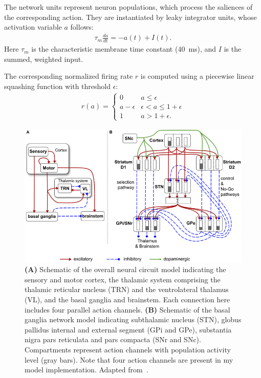 \documentclass[a4paper]{scrreprt}
\begin{document}
The network units represent neuron populations, which process the saliences of the corresponding action. They are instantiated by leaky integrator units, whose activation variable $a$ follows:
\begin{align}
\tau_m\frac{da}{dt} = -a(t)+I(t).
\end{align}
Here $\tau_m$ is the characteristic membrane time constant (40~ms), and $I$ is the summed, weighted input.

The corresponding normalized firing rate $r$ is computed using a piecewise linear squashing function with threshold $\epsilon$:
\begin{align}
r(a) = 
\begin{cases}
0 & a \le \epsilon\\
a-\epsilon & \epsilon < a \le 1+\epsilon\\
1 & a > 1+\epsilon.
\end{cases}
\end{align}

\begin{figure}
\centering
\includegraphics[width=\linewidth]{figs/bolado-gomez13_fig6.jpg}
\caption{\textbf{(A)} Schematic of the overall neural circuit model indicating the sensory and motor cortex, the thalamic system comprising the thalamic reticular nucleus (TRN) and the ventrolateral thalamus (VL), and the basal ganglia and brainstem. Each connection here includes four parallel action channels. \textbf{(B)} Schematic of the basal ganglia network model indicating subthalamic nucleus (STN), globus pallidus internal and external segment (GPi and GPe), substantia nigra pars reticulata and pars compacta (SNr and SNc). Compartments represent action channels with population activity level (gray bars). Note that four action channels are present in my model implementation. Adapted from~\cite{bg13}.}
\label{fig:network}
\end{figure}
\end{document}
